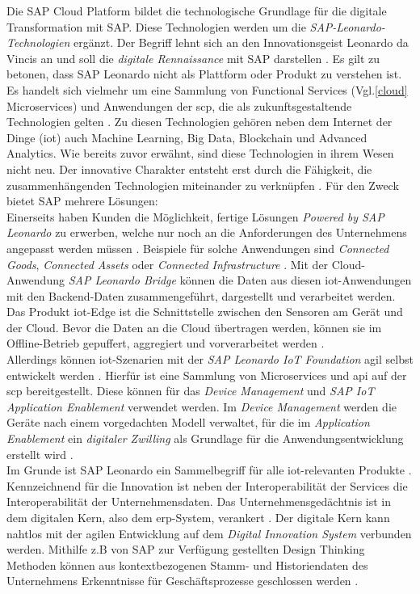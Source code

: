 Die SAP Cloud Platform bildet die technologische Grundlage für die digitale Transformation mit SAP. Diese Technologien werden um die \textit{SAP-Leonardo-Technologien} ergänzt. Der Begriff lehnt sich an den Innovationsgeist Leonardo da Vincis an und soll die \textit{digitale Rennaissance} mit SAP  darstellen \citep{Howells2017}. Es gilt zu betonen, dass SAP Leonardo nicht als Plattform oder Produkt zu verstehen ist. Es handelt sich vielmehr um eine Sammlung von Functional Services (Vgl.\ref{cloud} Microservices) und Anwendungen der \ac{scp}, die als zukunftsgestaltende Technologien gelten \citep{Elsner2018}. Zu diesen Technologien gehören neben dem Internet der Dinge (\acf{iot}) auch Machine Learning, Big Data, Blockchain und Advanced Analytics. Wie bereits zuvor erwähnt, sind diese Technologien in ihrem Wesen nicht neu. Der innovative Charakter entsteht erst durch die Fähigkeit, die zusammenhängenden Technologien miteinander zu verknüpfen \citep{Utecht2018}. Für den Zweck bietet SAP mehrere Lösungen:
 \\Einerseits haben Kunden die Möglichkeit, fertige Lösungen \textit{Powered by SAP Leonardo} zu erwerben, welche nur noch an die Anforderungen des Unternehmens angepasst werden müssen \citep{Utecht2018}. Beispiele für solche Anwendungen sind \textit{Connected Goods}, \textit{Connected Assets} oder \textit{Connected Infrastructure} \citep{Elsner2018}. Mit der Cloud-Anwendung \textit{SAP Leonardo Bridge} können die Daten aus diesen \ac{iot}-Anwendungen mit den Backend-Daten zusammengeführt, dargestellt und verarbeitet werden. Das Produkt \ac{iot}-Edge ist die Schnittstelle zwischen den Sensoren am Gerät und der Cloud. Bevor die Daten an die Cloud übertragen werden, können sie im Offline-Betrieb gepuffert, aggregiert und vorverarbeitet werden \citep{Utecht2018}.
\\Allerdings können \ac{iot}-Szenarien mit der \textit{SAP Leonardo IoT Foundation} agil selbst entwickelt werden \citep{Elsner2018}. Hierfür ist eine Sammlung von Microservices und \ac{api} auf der \ac{scp} bereitgestellt. Diese können für das \textit{Device Management} und \textit{SAP IoT Application Enablement} verwendet werden. Im \textit{Device Management} werden die Geräte nach einem vorgedachten Modell verwaltet, für die im \textit{Application Enablement} ein \textit{digitaler Zwilling} als Grundlage für die Anwendungsentwicklung erstellt wird \citep{Elsner2018}.
\\Im Grunde ist SAP Leonardo ein Sammelbegriff für alle \ac{iot}-relevanten Produkte \citep{Utecht2018}. Kennzeichnend für die Innovation ist neben der Interoperabilität der Services die Interoperabilität der Unternehmensdaten. Das Unternehmensgedächtnis ist in dem digitalen Kern, also dem \ac{erp}-System, verankert \citep{Elsner2018}. Der digitale Kern kann nahtlos mit der agilen Entwicklung auf dem \textit{Digital Innovation System} verbunden werden. Mithilfe  z.B von SAP zur Verfügung gestellten Design Thinking Methoden können aus kontextbezogenen Stamm- und Historiendaten des Unternehmens Erkenntnisse für Geschäftsprozesse geschlossen werden \citep{Elsner2018}.

